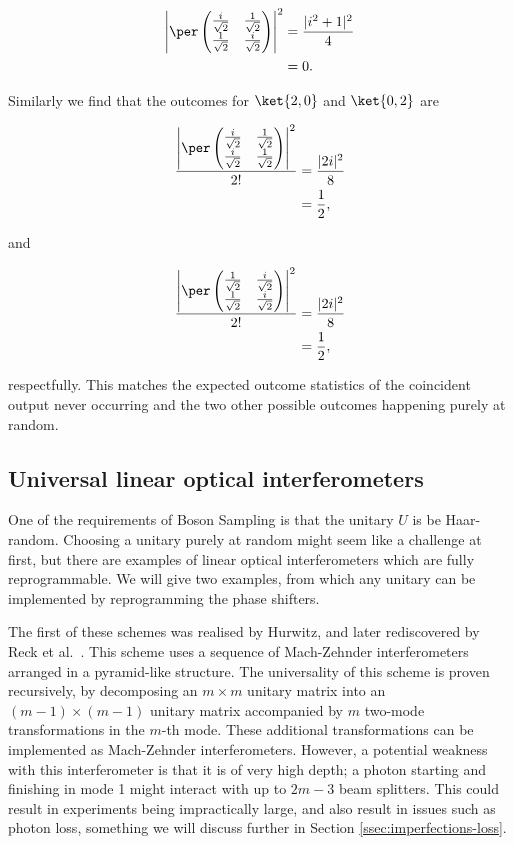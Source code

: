 \begin{align}
\left|\per\begin{pmatrix}\frac{i}{\sqrt{2}}&\frac{1}{\sqrt{2}}\\\frac{1}{\sqrt{2}}&\frac{i}{\sqrt{2}}\end{pmatrix}\right|^2 &= \frac{|i^2+1|^2}{4}\\
&= 0.
\end{align}

Similarly we find that the outcomes for $\ket{2,0}$ and $\ket{0,2}$ are

\begin{align}
\frac{\left|\per\begin{pmatrix}\frac{i}{\sqrt{2}}&\frac{1}{\sqrt{2}}\\\frac{i}{\sqrt{2}}&\frac{1}{\sqrt{2}}\end{pmatrix}\right|^2}{2!} &= \frac{|2i|^2}{8}\\
&= \frac{1}{2},
\end{align}

\noindent and

\begin{align}
\frac{\left|\per\begin{pmatrix}\frac{1}{\sqrt{2}}&\frac{i}{\sqrt{2}}\\\frac{1}{\sqrt{2}}&\frac{i}{\sqrt{2}}\end{pmatrix}\right|^2}{2!} &= \frac{|2i|^2}{8}\\
&= \frac{1}{2},
\end{align}

\noindent respectfully. This matches the expected outcome statistics of the coincident output never occurring and the two other possible outcomes happening purely at random.

\subsection{Universal linear optical interferometers}

One of the requirements of Boson Sampling is that the unitary $U$ is be Haar-random. Choosing a unitary purely at random might seem like a challenge at first, but there are examples of linear optical interferometers which are fully reprogrammable. We will give two examples, from which any unitary can be implemented by reprogramming the phase shifters.

The first of these schemes was realised by Hurwitz, and later rediscovered by Reck et al.~\cite{hurwitz1897, reck1994}. This scheme uses a sequence of Mach-Zehnder interferometers arranged in a pyramid-like structure. The universality of this scheme is proven recursively, by decomposing an $m\times m$ unitary matrix into an $(m-1)\times(m-1)$ unitary matrix accompanied by $m$ two-mode transformations in the $m$-th mode. These additional transformations can be implemented as Mach-Zehnder interferometers. However, a potential weakness with this interferometer is that it is of very high depth; a photon starting and finishing in mode 1 might interact with up to $2m-3$ beam splitters. This could result in experiments being impractically large, and also result in issues such as photon loss, something we will discuss further in Section \ref{ssec:imperfections-loss}.

